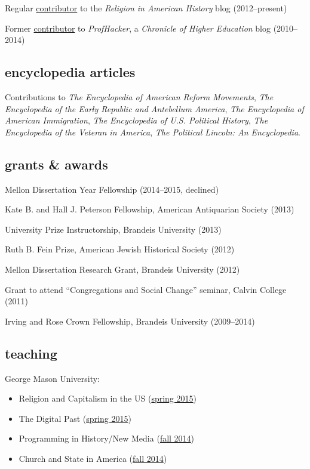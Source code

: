 \documentclass[11pt]{article}
\providecommand{\tightlist}{%
  \setlength{\itemsep}{0pt}\setlength{\parskip}{0pt}}
\begin{document}
Regular
\href{http://usreligion.blogspot.com/search/label/lincoln\%27s\%20posts}{contributor}
to the \emph{Religion in American History} blog (2012--present)

Former
\href{http://usreligion.blogspot.com/search/label/lincoln\%27s\%20posts}{contributor}
to \emph{ProfHacker}, a \emph{Chronicle of Higher Education} blog
(2010--2014)

\subsection{encyclopedia articles}\label{encyclopedia-articles}

Contributions to \emph{The Encyclopedia of American Reform Movements},
  \emph{The Encyclopedia of the Early Republic and Antebellum America},
  \emph{The Encyclopedia of American Immigration},
  \emph{The Encyclopedia of U.S. Political History},
  \emph{The Encyclopedia of the Veteran in America},
  \emph{The Political Lincoln: An Encyclopedia}.

\subsection{grants \& awards}\label{grants-awards}

Mellon Dissertation Year Fellowship (2014--2015, declined)

Kate B. and Hall J. Peterson Fellowship, American Antiquarian Society
(2013)

University Prize Instructorship, Brandeis University (2013)

Ruth B. Fein Prize, American Jewish Historical Society (2012)

Mellon Dissertation Research Grant, Brandeis University (2012)

Grant to attend ``Congregations and Social Change'' seminar, Calvin
College (2011)

Irving and Rose Crown Fellowship, Brandeis University (2009--2014)

\subsection{teaching}\label{teaching}

George Mason University:

\begin{itemize}
\tightlist
\item
  Religion and Capitalism in the US
  (\href{http://lincolnmullen.com/courses/religion-capitalism.2015/}{spring
  2015})
\item
  The Digital Past
  (\href{http://lincolnmullen.com/courses/digital-past-2015/}{spring
  2015})
\item
  Programming in History/New Media (\href{/courses/clio3.2014/}{fall
  2014})
\item
  Church and State in America (\href{/courses/church-state.2014/}{fall
  2014})
\end{itemize}
\end{document}

